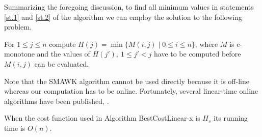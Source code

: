 Summarizing the foregoing discussion, to find all minimum values in statements \ref{st.1} and \ref{st.2} of the algorithm we can employ the solution to the following problem.
\begin{problem}
		For $1\leq j \leq n$ compute $H(j)=\min \{M(i,j) \mid 0\leq i \leq n\}$, where 
		$M$ is c-monotone and
	the values of $H(j'),\ 1\leq j'<j$ have to be computed before $M(i,j)$ can be evaluated.
\end{problem}
Note that the SMAWK algorithm cannot
be used directly because it is off-line whereas our computation has to be online.
Fortunately, several linear-time online algorithms have been published, 
\cite{klawe89,larmore91,galil92,barnoy09}.

\begin{theorem}
	When the cost function used in Algorithm BestCostLinear-x is $H_s$ its running time is $O(n)$.
\end{theorem}

\
